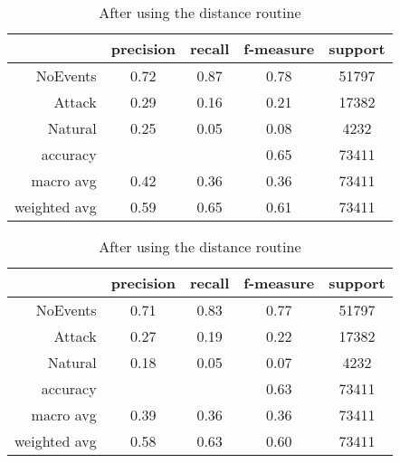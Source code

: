 \begin{table}[H]
    \centering \footnotesize
    \caption{Distance routine results for Random Forest classifier}  \label{tab:dist_rf}
    \begin{subtable}[t]{.5\linewidth}
        \centering
        \caption{Before using the distance routine} 
        \begin{tabular}{rcccc}\toprule
            & precision    &recall & f-measure  & support \\\midrule
            NoEvents   &    0.72  &    0.87 &     0.78 &  51797 \\
            Attack     &  0.29    &  0.16   &   0.21   &  17382 \\
           Natural     &  0.25    &  0.05   &   0.08   &   4232 \\
          accuracy     &          &         &   0.65   &  73411 \\
         macro avg     &  0.42    &  0.36   &   0.36   &  73411 \\
      weighted avg     &  0.59    &  0.65   &   0.61   &  73411 \\ \bottomrule
        \end{tabular}
    \end{subtable}%
    \begin{subtable}[t]{.5\linewidth}
        \centering
        \caption{After using the distance routine} 
        \begin{tabular}{rcccc}\toprule
         &   precision    &recall & f-measure &  support  \\\midrule
    
        NoEvents   &    0.71 &     0.83 &     0.77 &   51797\\
         Attack    &   0.27  &    0.19  &    0.22  &   17382\\
        Natural    &   0.18  &    0.05  &    0.07  &    4232\\
       accuracy    &         &          &    0.63  &   73411\\
      macro avg    &   0.39  &    0.36  &    0.36  &   73411\\
   weighted avg    &   0.58  &    0.63  &    0.60  &   73411\\  \bottomrule
        \end{tabular}
    \end{subtable}
\end{table}

